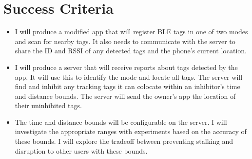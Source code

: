 \documentclass{article}
\begin{document}
\begin{itemize}
\end{itemize}




\section{Success Criteria}
\begin{itemize}
\item{I will produce a modified app that will register BLE tags in one of two modes and scan for nearby tags. It also needs to communicate with the server to share the ID and RSSI of any detected tags and the phone's current location.}


\item{I will produce a server that will receive reports about tags detected by the app. It will use this to identify the mode and locate all tags. The server will find and inhibit any tracking tags it can colocate within an inhibitor's time and distance bounds. The server will send the owner's app the location of their uninhibited tags. }


\item{The time and distance bounds will be configurable on the server. I will investigate the appropriate ranges with experiments based on the accuracy of these bounds. I will explore the tradeoff between preventing stalking and disruption to other users with these bounds.}


\end{itemize}
\end{document}
